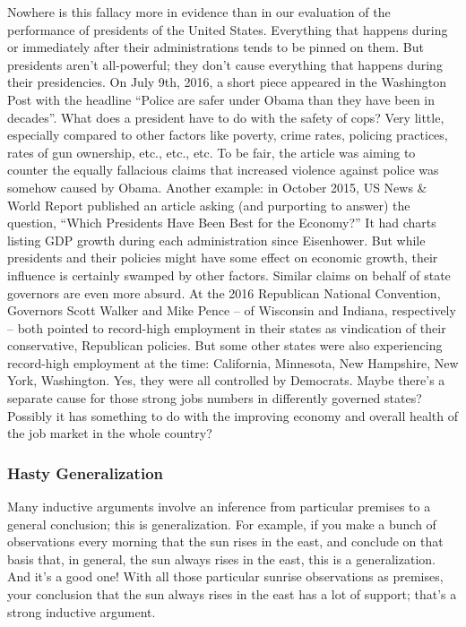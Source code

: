 Nowhere is this fallacy more in evidence than in our evaluation of the performance of presidents
of the United States. Everything that happens during or immediately after their administrations
tends to be pinned on them. But presidents aren't all-powerful; they don't cause everything that
happens during their presidencies. On July 9th, 2016, a short piece appeared in the Washington
Post with the headline ``Police are safer under Obama than they have been in decades''. What does
a president have to do with the safety of cops? Very little, especially compared to other factors like
poverty, crime rates, policing practices, rates of gun ownership, etc., etc., etc. To be fair, the article
was aiming to counter the equally fallacious claims that increased violence against police was
somehow caused by Obama. Another example: in October 2015, US News \& World Report
published an article asking (and purporting to answer) the question, ``Which Presidents Have Been
Best for the Economy?'' It had charts listing GDP growth during each administration since
Eisenhower. But while presidents and their policies might have some effect on economic growth,
their influence is certainly swamped by other factors. Similar claims on behalf of state governors
are even more absurd. At the 2016 Republican National Convention, Governors Scott Walker and
Mike Pence -- of Wisconsin and Indiana, respectively -- both pointed to record-high employment
in their states as vindication of their conservative, Republican policies. But some other states were
also experiencing record-high employment at the time: California, Minnesota, New Hampshire,
New York, Washington. Yes, they were all controlled by Democrats. Maybe there's a separate
cause for those strong jobs numbers in differently governed states? Possibly it has something to
do with the improving economy and overall health of the job market in the whole country?

\subsubsection{Hasty Generalization}
Many inductive arguments involve an inference from particular premises to a general conclusion;
this is generalization. For example, if you make a bunch of observations every morning that the
sun rises in the east, and conclude on that basis that, in general, the sun always rises in the east,
this is a generalization. And it's a good one! With all those particular sunrise observations as
premises, your conclusion that the sun always rises in the east has a lot of support; that's a strong
inductive argument.

